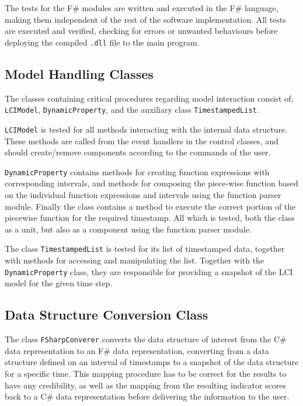 \vspace{1cm}
The tests for the F\# modules are written and executed in the F\# language, making them independent of the rest of the software implementation. All tests are executed and verified, checking for errors or unwanted behaviours before deploying the compiled \texttt{.dll} file to the main program.

\subsection{Model Handling Classes}

The classes containing critical procedures regarding model interaction consist of; \texttt{LCIModel}, \texttt{DynamicProperty}, and the auxiliary class \texttt{TimestampedList}. 

\texttt{LCIModel} is tested for all methods interacting with the internal data structure. These methods are called from the event handlers in the control classes, and should create/remove components according to the commands of the user.

\texttt{DynamicProperty} contains methods for creating function expressions with corresponding intervals, and methods for composing the piece-wise function based on the individual function expressions and intervals using the function parser module. Finally the class contains a method to execute the correct portion of the piecewise function for the required timestamp. All which is tested, both the class as a unit, but also as a component using the function parser module.

The class \texttt{TimestampedList} is tested for its list of timestamped data, together with methods for accessing and manipulating the list. Together with the \texttt{DynamicProperty} class, they are responsible for providing a snapshot of the LCI model for the given time step.

\subsection{Data Structure Conversion Class}
The class \texttt{FSharpConverer} converts the data structure of interest from the C\# data representation to an F\# data representation, converting from a data structure defined on an interval of timestamps to a snapshot of the data structure for a specific time. This mapping procedure has to be correct for the results to have any credibility, as well as the mapping from the resulting indicator scores back to a C\# data representation before delivering the information to the user.

